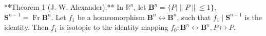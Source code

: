 **Theorem 1 (J. W. Alexander).** In $\mathbb{R}^n$, let $\mathbf{B}^n = \{P \mid \|P\| \leqslant 1\}$, $\mathbf{S}^{n-1} = \operatorname{Fr} \mathbf{B}^n$. Let $f_1$ be a homeomorphism $\mathbf{B}^n \leftrightarrow \mathbf{B}^n$, such that $f_1 \mid \mathbf{S}^{n-1}$ is the identity. Then $f_1$ is isotopic to the identity mapping $f_0: \mathbf{B}^n \leftrightarrow \mathbf{B}^n, P \mapsto P$.
